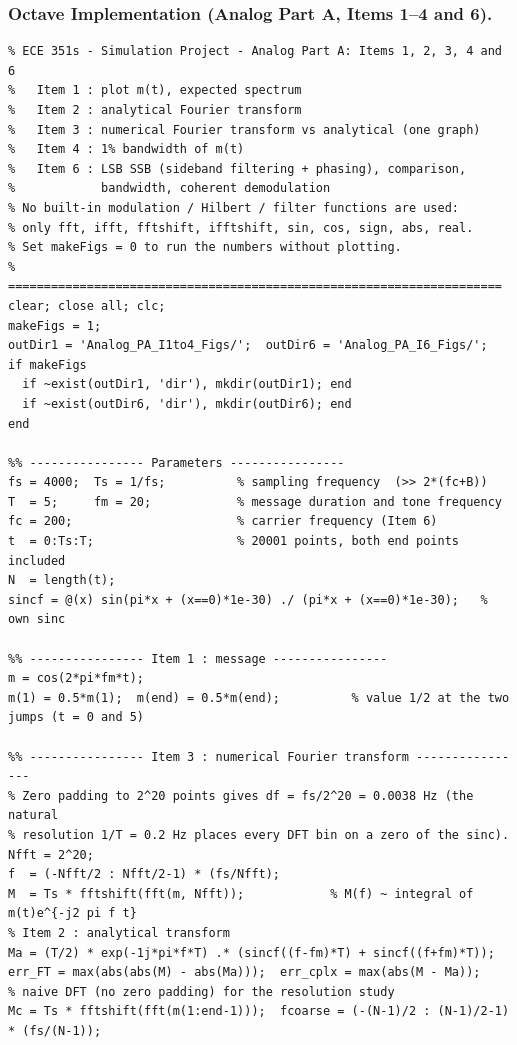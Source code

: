\documentclass[a4paper]{article}
\begin{document}
\subsubsection*{Octave Implementation (Analog Part A, Items 1--4 and 6).}
\begin{lstlisting}[frame=single, breaklines=true, basicstyle=\ttfamily\scriptsize]
% =====================================================================
% ECE 351s - Simulation Project - Analog Part A: Items 1, 2, 3, 4 and 6
%   Item 1 : plot m(t), expected spectrum
%   Item 2 : analytical Fourier transform
%   Item 3 : numerical Fourier transform vs analytical (one graph)
%   Item 4 : 1% bandwidth of m(t)
%   Item 6 : LSB SSB (sideband filtering + phasing), comparison,
%            bandwidth, coherent demodulation
% No built-in modulation / Hilbert / filter functions are used:
% only fft, ifft, fftshift, ifftshift, sin, cos, sign, abs, real.
% Set makeFigs = 0 to run the numbers without plotting.
% =====================================================================
clear; close all; clc;
makeFigs = 1;
outDir1 = 'Analog_PA_I1to4_Figs/';  outDir6 = 'Analog_PA_I6_Figs/';
if makeFigs
  if ~exist(outDir1, 'dir'), mkdir(outDir1); end
  if ~exist(outDir6, 'dir'), mkdir(outDir6); end
end

%% ---------------- Parameters ----------------
fs = 4000;  Ts = 1/fs;          % sampling frequency  (>> 2*(fc+B))
T  = 5;     fm = 20;            % message duration and tone frequency
fc = 200;                       % carrier frequency (Item 6)
t  = 0:Ts:T;                    % 20001 points, both end points included
N  = length(t);
sincf = @(x) sin(pi*x + (x==0)*1e-30) ./ (pi*x + (x==0)*1e-30);   % own sinc

%% ---------------- Item 1 : message ----------------
m = cos(2*pi*fm*t);
m(1) = 0.5*m(1);  m(end) = 0.5*m(end);          % value 1/2 at the two jumps (t = 0 and 5)

%% ---------------- Item 3 : numerical Fourier transform ----------------
% Zero padding to 2^20 points gives df = fs/2^20 = 0.0038 Hz (the natural
% resolution 1/T = 0.2 Hz places every DFT bin on a zero of the sinc).
Nfft = 2^20;
f  = (-Nfft/2 : Nfft/2-1) * (fs/Nfft);
M  = Ts * fftshift(fft(m, Nfft));            % M(f) ~ integral of m(t)e^{-j2 pi f t}
% Item 2 : analytical transform
Ma = (T/2) * exp(-1j*pi*f*T) .* (sincf((f-fm)*T) + sincf((f+fm)*T));
err_FT = max(abs(abs(M) - abs(Ma)));  err_cplx = max(abs(M - Ma));
% naive DFT (no zero padding) for the resolution study
Mc = Ts * fftshift(fft(m(1:end-1)));  fcoarse = (-(N-1)/2 : (N-1)/2-1) * (fs/(N-1));


\end{lstlisting}
\end{document}
